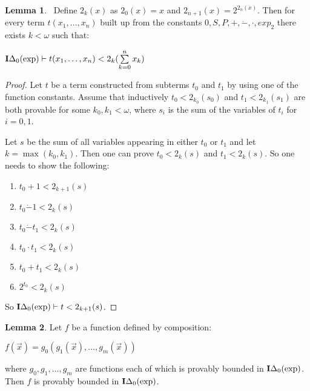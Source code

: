 \documentclass[8pt]{article}
\theoremstyle{definition}
\theoremstyle{definition}
\theoremstyle{definition}
\theoremstyle{definition}
\theoremstyle{definition}
\theoremstyle{definition}
\theoremstyle{definition}
\theoremstyle{definition}
\newtheorem{lemma}{Lemma}[section]
\theoremstyle{definition}
\theoremstyle{definition}
\theoremstyle{definition}
\theoremstyle{definition}
\theoremstyle{definition}
\theoremstyle{question}
\begin{document}
\begin{lemma}~\label{upper:bound:elem}
  Define $2_k(x)$ as $2_0(x) = x$ and $2_{n + 1}(x) = 2^{2_n(x)}$. 
  Then for every term $t(x_1, \dots, x_n)$ built up from the constants $0, S, P, +, \dot{-}, \cdot, exp_2$ there exists $k < \omega$ such that:
  \begin{center}
    ${\bf I}\Delta_0(\operatorname{exp}) \vdash t(x_1, \dots, x_n) < 2_k(\sum \limits_{k = 0}^n x_k)$
  \end{center}
\end{lemma}

\begin{proof}
Let $t$ be a term constructed from subterms $t_0$ and $t_1$ by using one of the function constants.
Assume that inductively $t_0 < 2_{k_0}(s_0)$ and $t_1 < 2_{k_1}(s_1)$ are both provable for some $k_0, k_1 < \omega$, where
$s_i$ is the sum of the variables of $t_i$ for $i = 0, 1$.

Let $s$ be the sum of all variables appearing in either $t_0$ or $t_1$ and let $k = \max(k_0, k_1)$.
Then one can prove $t_0 < 2_{k}(s)$ and $t_1 < 2_{k}(s)$. So one needs to show the following:
\begin{enumerate}
  \item $t_0 + 1 < 2_{k + 1}(s)$
  \item $t_0 \dot{-} 1 < 2_{k}(s)$
  \item $t_0 \dot{-} t_1 < 2_{k}(s)$
  \item $t_0 \cdot t_1 < 2_{k}(s)$
  \item $t_0 + t_1 < 2_{k}(s)$
  \item $2^{t_0} < 2_{k}(s)$
\end{enumerate}
So ${\bf I}\Delta_0(\operatorname{exp}) \vdash t < 2_{k + 1}(s)$.
\end{proof}

\begin{lemma}
  Let $f$ be a function defined by composition:
  \begin{center}
    $f(\vec{x}) = g_0(g_1(\vec{x}), \dots, g_m(\vec{x}))$
  \end{center}
  where $g_0, g_1, \dots, g_m$ are functions each of which is provably bounded in ${\bf I}\Delta_0(\operatorname{exp})$.
  Then $f$ is provably bounded in ${\bf I}\Delta_0(\operatorname{exp})$.
\end{lemma}
\end{document}

